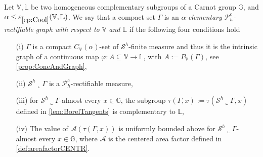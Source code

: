 \documentclass[10pt, a4paper,
oneside, headinclude,footinclude]{scrartcl}
\begin{document}
\begin{definizione}\label{def:ElementaryPh}
Let $\mathbb V,\mathbb L$ be two homogeneous complementary subgroups of a Carnot group $\mathbb G$, and $\alpha\leq\oldep{ep:Cool}(\mathbb V,\mathbb L)$. We say that a compact set $\Gamma$ is an $\alpha$-{\em elementary $\mathscr{P}_h^c$-rectifiable graph with respect to $\mathbb V$ and $\mathbb L$} if the following four conditions hold 
\begin{enumerate}
    \item[(i)] $\Gamma$ is a compact $C_{\mathbb V}(\alpha)$-set of $\mathcal{S}^h$-finite measure and thus it is  the intrinsic graph of a continuous map $\varphi:A\subseteq\mathbb V\to\mathbb L$, with $A:=P_{\mathbb V}(\Gamma)$, see \cref{prop:ConeAndGraph},
    \item[(ii)] $\mathcal{S}^h\llcorner\Gamma$ is a $\mathscr{P}_h^c$-rectifiable measure,
    \item[(iii)] for $\mathcal{S}^h\llcorner\Gamma$-almost every $x\in\mathbb G$, the subgroup $\tau(\Gamma,x):=\tau(\mathcal{S}^h\llcorner\Gamma,x)$ defined in \cref{lem:BorelTangents} is complementary to $\mathbb L$,
   \item[(iv)] The value of $\mathcal{A}(\tau(\Gamma,x))$ is uniformly bounded above for $\mathcal{S}^h\llcorner\Gamma$-almost every $x\in\mathbb G$, where $\mathcal{A}$ is the centered area factor defined in \cref{def:areafactorCENTR}.
\end{enumerate}
\end{definizione}
\end{document}
